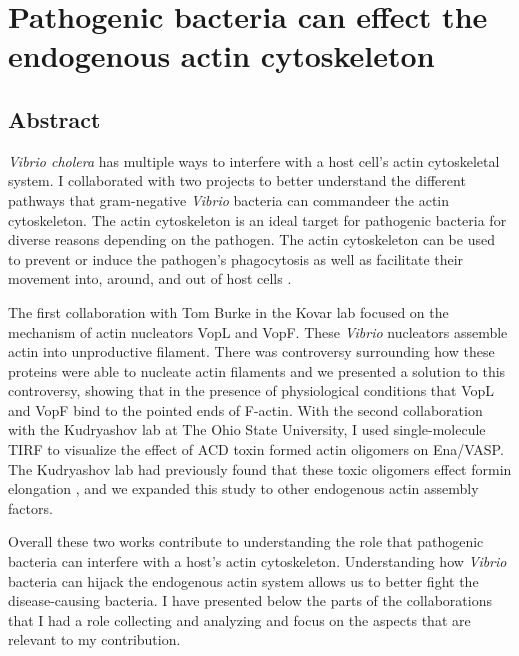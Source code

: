 \chapter{Pathogenic bacteria can effect the endogenous actin cytoskeleton}\label{ch:vibrio}

\section[Abstract]{Abstract\footnotemark}
\textit{Vibrio cholera} has multiple ways to interfere with a host cell’s actin cytoskeletal system. I collaborated with two projects to better understand the different pathways that gram-negative \textit{Vibrio} bacteria can commandeer the actin cytoskeleton. The actin cytoskeleton is an ideal target for pathogenic bacteria for diverse reasons depending on the pathogen. The actin cytoskeleton can be used to prevent or induce the pathogen's phagocytosis as well as facilitate their movement into, around, and out of host cells \citep{liverman_arp2/3-independent_2007}. 

The first collaboration with Tom Burke in the Kovar lab focused on the mechanism of actin nucleators VopL and VopF. These \textit{Vibrio} nucleators assemble actin into unproductive filament. There was controversy surrounding how these proteins were able to nucleate actin filaments and we presented a solution to this controversy, showing that in the presence of physiological conditions that VopL and VopF bind to the pointed ends of F-actin. With the second collaboration with the Kudryashov lab at The Ohio State University, I used single-molecule TIRF to visualize the effect of ACD toxin formed actin oligomers on Ena/VASP. The Kudryashov lab had previously found that these toxic oligomers effect formin elongation \citep{heisler_acd_2015}, and we expanded this study to other endogenous actin assembly factors. 

Overall these two works contribute to understanding the role that pathogenic bacteria can interfere with a host's actin cytoskeleton. Understanding how \textit{Vibrio} bacteria can hijack the endogenous actin system allows us to better fight the disease-causing bacteria. I have presented below the parts of the collaborations that I had a role collecting and analyzing and focus on the aspects that are relevant to my contribution. 


